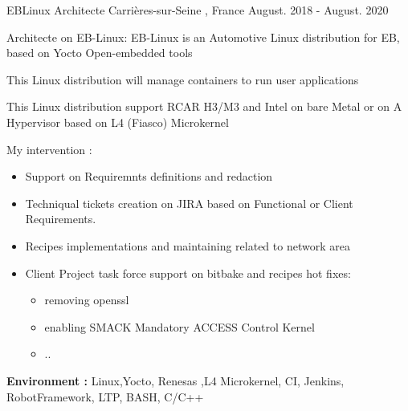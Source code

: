 \documentclass[11pt, a4paper]{awesome-cv} %
\begin{document}
\begin{cventries}
    \cventry
    {EBLinux Architecte } %
    {} %
    {Carrières-sur-Seine , France} %
    {August. 2018 - August. 2020} %
    { %
        \begin{cvitems}
            \item {Architecte on EB-Linux: EB-Linux is an Automotive Linux distribution for EB, based on Yocto Open-embedded tools}
            \item {This Linux distribution will manage containers to run user applications }
            \item {This Linux distribution support RCAR H3/M3 and Intel on bare Metal or on A Hypervisor based on L4 (Fiasco) Microkernel}
            \item {My intervention :}
            \begin{itemize}
                \item Support on Requiremnts definitions and redaction
                \item Techniqual tickets creation on JIRA based on Functional or Client Requirements.
                \item Recipes implementations and maintaining related to network area
                \item Client Project task force support on bitbake and recipes hot fixes:
                \begin{itemize}
                    \item removing openssl
                    \item enabling SMACK Mandatory ACCESS Control Kernel 
                    \item ..
                  \end{itemize}
              \end{itemize}
            \item { \textbf{Environment :} Linux,Yocto, Renesas ,L4 Microkernel, CI, Jenkins, RobotFramework, LTP, BASH, C/C++}
        \end{cvitems}
    }


\end{cventries}
\end{document}
